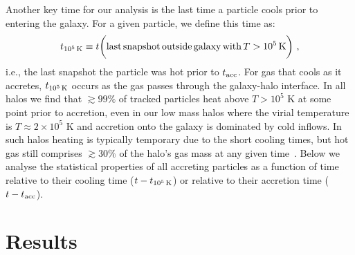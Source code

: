 \documentclass[fleqn,usenatbib]{mnras}
\newcommand{\tcools}{t_{10^5\,{\rm K}}}
\newcommand{\tacc}{t_{\rm acc}}
\begin{document}
Another key time for our analysis is the last time a particle cools prior to entering the galaxy.
For a given particle, we define this time as:
\begin{equation}
    \tcools \equiv t \bigg( {\rm last\,snapshot\,outside\,galaxy\,with\,}T>10^5\,{\rm K} \bigg) ~,
\label{e: tcools}
\end{equation}
i.e., the last snapshot the particle was hot prior to $\tacc$.
For gas that cools as it accretes, $\tcools$ occurs as the gas passes through the galaxy-halo interface.
In all halos we find that $\gtrsim99\%$ of tracked particles heat above $T > 10^5$ K at some point prior to accretion, even in our low mass halos where the virial temperature is $T \approx 2 \times 10^5$ K and  accretion onto the galaxy is dominated by cold inflows. 
In such halos heating is typically temporary due to the short cooling times, but hot gas still comprises $\gtrsim 30\%$ of the halo's gas mass at any given time~\citep{Hafen2019,Hafen2020}.
Below we analyse the statistical properties of all accreting particles as a function of time relative to their cooling time ($t-\tcools$) or relative to their accretion time ($t-\tacc$).

\section{Results}
\label{s: results}
\end{document}
